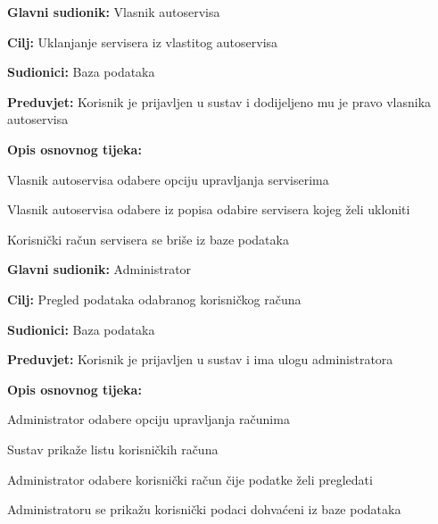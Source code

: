 \noindent {}
\begin{packed_item}

	\item \textbf{Glavni sudionik: } Vlasnik autoservisa
	\item  \textbf{Cilj:} Uklanjanje servisera iz vlastitog autoservisa
	\item  \textbf{Sudionici:} Baza podataka
	\item  \textbf{Preduvjet:} Korisnik je prijavljen u sustav i dodijeljeno
	mu je pravo vlasnika autoservisa
	\item  \textbf{Opis osnovnog tijeka:}

	\item[] \begin{packed_enum}

		\item Vlasnik autoservisa odabere opciju upravljanja serviserima
		\item Vlasnik autoservisa odabere iz popisa odabire servisera kojeg želi
		ukloniti
		\item Korisnički račun servisera se briše iz baze podataka

	\end{packed_enum}
\end{packed_item}


\noindent {}
\begin{packed_item}

	\item \textbf{Glavni sudionik: } Administrator
	\item  \textbf{Cilj:} Pregled podataka odabranog
	korisničkog računa
	\item  \textbf{Sudionici:} Baza podataka
	\item  \textbf{Preduvjet:} Korisnik je prijavljen u sustav i ima ulogu administratora
	\item  \textbf{Opis osnovnog tijeka:}

	\item[] \begin{packed_enum}

		\item Administrator odabere opciju upravljanja
		računima
		\item Sustav prikaže listu korisničkih računa
		\item Administrator odabere korisnički račun čije podatke želi pregledati
		\item Administratoru se prikažu korisnički podaci dohvaćeni iz baze podataka

	\end{packed_enum}
\end{packed_item}

